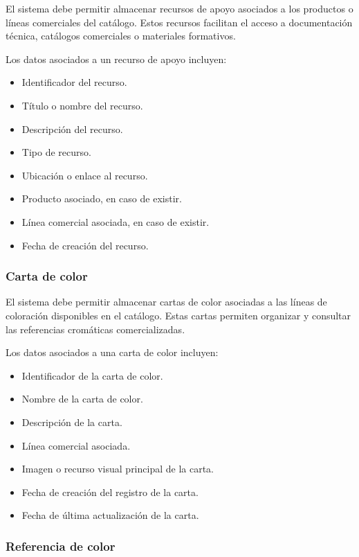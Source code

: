 El sistema debe permitir almacenar recursos de apoyo asociados a los productos o líneas comerciales del catálogo. Estos recursos facilitan el acceso a documentación técnica, catálogos comerciales o materiales formativos.

Los datos asociados a un recurso de apoyo incluyen:

\begin{itemize}
    \item Identificador del recurso.
    \item Título o nombre del recurso.
    \item Descripción del recurso.
    \item Tipo de recurso.
    \item Ubicación o enlace al recurso.
    \item Producto asociado, en caso de existir.
    \item Línea comercial asociada, en caso de existir.
    \item Fecha de creación del recurso.
\end{itemize}

\subsubsection*{Carta de color}

El sistema debe permitir almacenar cartas de color asociadas a las líneas de coloración disponibles en el catálogo. Estas cartas permiten organizar y consultar las referencias cromáticas comercializadas.

Los datos asociados a una carta de color incluyen:

\begin{itemize}
    \item Identificador de la carta de color.
    \item Nombre de la carta de color.
    \item Descripción de la carta.
    \item Línea comercial asociada.
    \item Imagen o recurso visual principal de la carta.
    \item Fecha de creación del registro de la carta.
    \item Fecha de última actualización de la carta.
\end{itemize}

\subsubsection*{Referencia de color}

